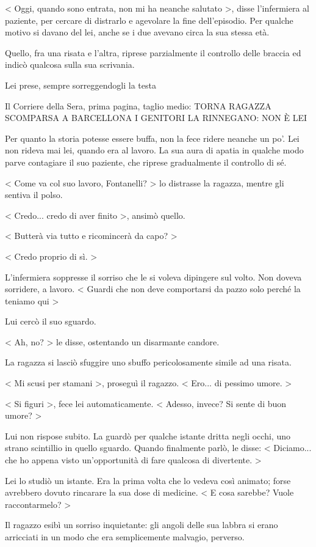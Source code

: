 < Oggi, quando sono entrata, non mi ha neanche salutato >, disse l'infermiera al paziente, per cercare di distrarlo e agevolare la fine dell'episodio. Per qualche motivo si davano del lei, anche se i due avevano circa la sua stessa età.

Quello, fra una risata e l'altra, riprese parzialmente il controllo delle braccia ed indicò qualcosa sulla sua scrivania.

Lei prese, sempre sorreggendogli la testa

Il Corriere della Sera, prima pagina, taglio medio:
TORNA RAGAZZA SCOMPARSA A BARCELLONA
I GENITORI LA RINNEGANO: NON È LEI

Per quanto la storia potesse essere buffa, non la fece ridere neanche un po'. Lei non rideva mai lei, quando era al lavoro. La sua aura di apatia in qualche modo parve contagiare il suo paziente, che riprese gradualmente il controllo di sé.

< Come va col suo lavoro, Fontanelli? > lo distrasse la ragazza, mentre gli sentiva il polso.

< Credo... credo di aver finito >, ansimò quello.

< Butterà via tutto e ricomincerà da capo? >

< Credo proprio di sì. >

L'infermiera soppresse il sorriso che le si voleva dipingere sul volto. Non doveva sorridere, a lavoro. < Guardi che non deve comportarsi da pazzo solo perché la teniamo qui >

Lui cercò il suo sguardo.

< Ah, no? > le disse, ostentando un disarmante candore.

La ragazza si lasciò sfuggire uno sbuffo pericolosamente simile ad una risata.

< Mi scusi per stamani >, proseguì il ragazzo. < Ero... di pessimo umore. >

< Si figuri >, fece lei automaticamente. < Adesso, invece? Si sente di buon umore? >

Lui non rispose subito. La guardò per qualche istante dritta negli occhi, uno strano scintillio in quello sguardo. Quando finalmente parlò, le disse: < Diciamo... che ho appena visto un'opportunità di fare qualcosa di divertente. >

Lei lo studiò un istante. Era la prima volta che lo vedeva così animato; forse avrebbero dovuto rincarare la sua dose di medicine. < E cosa sarebbe? Vuole raccontarmelo? >

Il ragazzo esibì un sorriso inquietante: gli angoli delle sua labbra si erano arricciati in un modo che era semplicemente malvagio, perverso.

